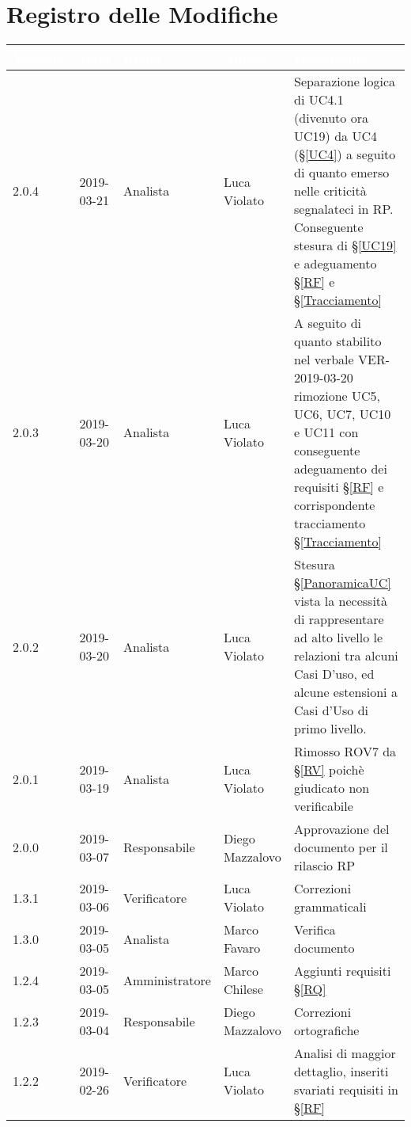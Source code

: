 \section*{Registro delle Modifiche}

\begin{center}
\begin{longtable}[C]{|m{}|m{}|m{}|m{}|p{}|}
\hline
\rowcolor{bluelogo}\textbf{\textcolor{white}{Versione}} & \textbf{\textcolor{white}{Data}} & \textbf{\textcolor{white}{Ruolo}} & \textbf{\textcolor{white}{Autore}} & \textbf{\textcolor{white}{Descrizione}} \\
\hline \hline
\endhead
2.0.4 & 2019-03-21 & Analista & Luca Violato & Separazione logica di UC4.1 (divenuto ora UC19) da UC4 (§\ref{UC4}) a seguito di quanto emerso nelle criticità segnalateci in RP. Conseguente stesura di §\ref{UC19} e adeguamento §\ref{RF} e §\ref{Tracciamento}\\
\hline
\rowcolor{grigio}2.0.3 & 2019-03-20 & Analista & Luca Violato & A seguito di quanto stabilito nel verbale VER-2019-03-20 rimozione UC5, UC6, UC7, UC10 e UC11 con conseguente adeguamento dei requisiti §\ref{RF} e corrispondente tracciamento §\ref{Tracciamento}\\
\hline
2.0.2 & 2019-03-20 & Analista & Luca Violato & Stesura §\ref{PanoramicaUC} vista la necessità di rappresentare ad alto livello le relazioni tra alcuni Casi D'uso, ed alcune estensioni a Casi d'Uso di primo livello.\\
\hline
\rowcolor{grigio}2.0.1 & 2019-03-19 & Analista & Luca Violato & Rimosso ROV7 da §\ref{RV} poichè giudicato non verificabile\\
\hline
2.0.0 & 2019-03-07 & Responsabile & Diego Mazzalovo & Approvazione del documento per il rilascio RP\\
\hline
\rowcolor{grigio}1.3.1 & 2019-03-06 & Verificatore & Luca Violato & Correzioni grammaticali\\
\hline
1.3.0 & 2019-03-05 & Analista & Marco Favaro & Verifica documento\\
\hline
\rowcolor{grigio}1.2.4 & 2019-03-05 & Amministratore & Marco Chilese & Aggiunti requisiti §\ref{RQ}\\
\hline
1.2.3 & 2019-03-04 & Responsabile & Diego Mazzalovo & Correzioni ortografiche\\
\hline
\rowcolor{grigio}1.2.2 & 2019-02-26 & Verificatore & Luca Violato & Analisi di maggior dettaglio, inseriti svariati requisiti in §\ref{RF}\\

\end{longtable}
\end{center}
